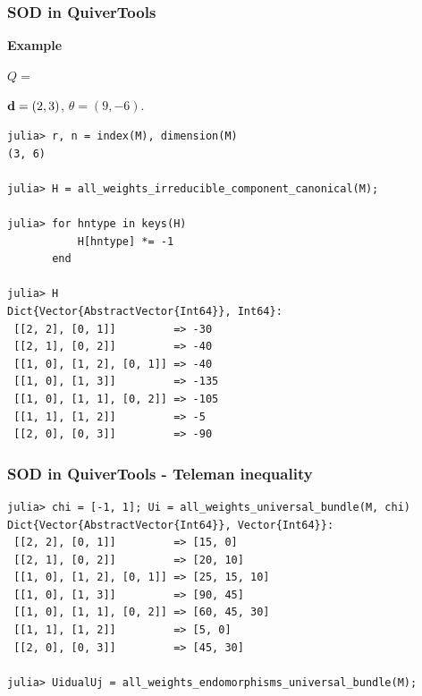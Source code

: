 \documentclass{beamer}
\begin{document}
\begin{frame}[fragile]
    \frametitle{SOD in QuiverTools}
\textbf{Example}
\begin{center}

    $Q = $
    $\mathbf{d} = (2, 3)$, $\theta = (9, -6)$. \pause
\end{center}  
\scriptsize{
\begin{lstlisting}
julia> r, n = index(M), dimension(M)
(3, 6)

julia> H = all_weights_irreducible_component_canonical(M);

julia> for hntype in keys(H)
           H[hntype] *= -1
       end

julia> H
Dict{Vector{AbstractVector{Int64}}, Int64}:
 [[2, 2], [0, 1]]         => -30
 [[2, 1], [0, 2]]         => -40
 [[1, 0], [1, 2], [0, 1]] => -40
 [[1, 0], [1, 3]]         => -135
 [[1, 0], [1, 1], [0, 2]] => -105
 [[1, 1], [1, 2]]         => -5
 [[2, 0], [0, 3]]         => -90
\end{lstlisting}
}
\end{frame}

\begin{frame}[fragile]
    \frametitle{SOD in QuiverTools - Teleman inequality}
\scriptsize{
\begin{lstlisting}
julia> chi = [-1, 1]; Ui = all_weights_universal_bundle(M, chi)
Dict{Vector{AbstractVector{Int64}}, Vector{Int64}}:
 [[2, 2], [0, 1]]         => [15, 0]
 [[2, 1], [0, 2]]         => [20, 10]
 [[1, 0], [1, 2], [0, 1]] => [25, 15, 10]
 [[1, 0], [1, 3]]         => [90, 45]
 [[1, 0], [1, 1], [0, 2]] => [60, 45, 30]
 [[1, 1], [1, 2]]         => [5, 0]
 [[2, 0], [0, 3]]         => [45, 30]

julia> UidualUj = all_weights_endomorphisms_universal_bundle(M);
\end{lstlisting}
}
\end{frame}
\end{document}
